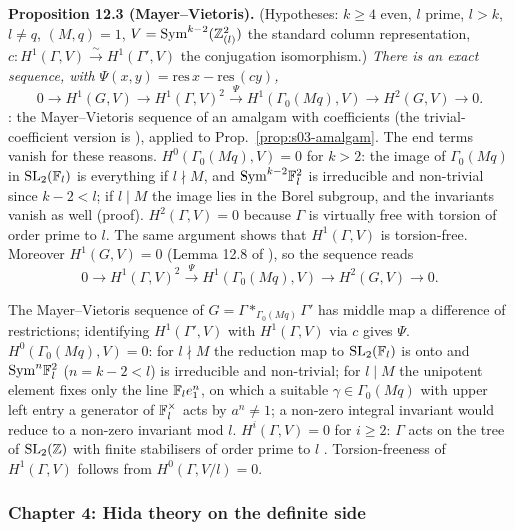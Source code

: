 \noindent{}\label{rpt:prop:s03-MV}\textbf{Proposition 12.3 (Mayer--Vietoris).}
(Hypotheses: $k\ge4$ even, $l$ prime, $l>k$, $l\ne q$, $(M,q)=1$, $V=\mathrm{Sym}^{k-2}(\mathbb{Z}_{(l)}^2)$ the standard column representation,
$c:H^1(\Gamma,V)\xrightarrow\sim H^1(\Gamma',V)$ the conjugation isomorphism.)
\emph{There is an exact sequence, with $\Psi(x,y)=\mathrm{res}\,x-\mathrm{res}\,(cy)$,
\[0\to H^1(G,V)\to H^1(\Gamma,V)^2\xrightarrow{\ \Psi\ }H^1(\Gamma_0(Mq),V)\to H^2(G,V)\to0.\]}
\stpmc: the Mayer--Vietoris sequence of an amalgam with coefficients \cite[III.6, Exercise, p.~74]{Br} \stcited{} (the trivial-coefficient
version is \cite[II, Cor.~7.7, p.~51]{Br}), applied to Prop.~\ref{prop:s03-amalgam}. The end terms vanish for these reasons.
$H^0(\Gamma_0(Mq),V)=0$ for $k>2$: the image of $\Gamma_0(Mq)$ in $\mathrm{SL}_2(\mathbb{F}_l)$ is everything if $l\nmid M$, and $\mathrm{Sym}^{k-2}\mathbb{F}_l^2$ is irreducible and
non-trivial since $k-2<l$; if $l\mid M$ the image lies in the Borel subgroup, and the invariants vanish as well (proof). $H^2(\Gamma,V)=0$ because
$\Gamma$ is virtually free with torsion of order prime to $l$. The same argument shows that $H^1(\Gamma,V)$ is torsion-free.
Moreover $H^1(G,V)=0$ (Lemma 12.8 of \mainpdf), so the sequence reads
\[0\to H^1(\Gamma,V)^2\xrightarrow{\ \Psi\ }H^1(\Gamma_0(Mq),V)\to H^2(G,V)\to0.\]
\begin{outline}
The Mayer--Vietoris sequence of $G=\Gamma*_{\Gamma_0(Mq)}\Gamma'$ has middle map a difference of restrictions; identifying $H^1(\Gamma',V)$
with $H^1(\Gamma,V)$ via $c$ gives $\Psi$. $H^0(\Gamma_0(Mq),V)=0$: for $l\nmid M$ the reduction map to $\mathrm{SL}_2(\mathbb{F}_l)$ is onto and
$\mathrm{Sym}^n\mathbb{F}_l^2$ ($n=k-2<l$) is irreducible and non-trivial; for $l\mid M$ the unipotent element fixes only the line $\mathbb{F}_le_1^n$, on which a
suitable $\gamma\in\Gamma_0(Mq)$ with upper left entry a generator of $\mathbb{F}_l^\times$ acts by $a^n\ne1$; a non-zero integral invariant would
reduce to a non-zero invariant mod $l$. $H^i(\Gamma,V)=0$ for $i\ge2$: $\Gamma$ acts on the tree of $\mathrm{SL}_2(\mathbb{Z})$ with finite stabilisers of
order prime to $l$ \cite[I.4.2(c), p.~35]{Se}. Torsion-freeness of $H^1(\Gamma,V)$ follows from $H^0(\Gamma,V/l)=0$.
\end{outline}

\subsubsection*{Chapter 4: Hida theory on the definite side}

